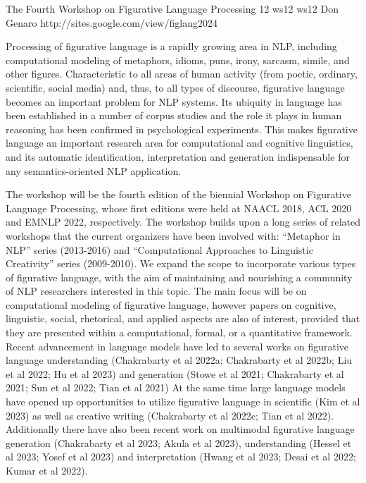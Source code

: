 \begin{wsschedulenolist}
{The Fourth Workshop on Figurative Language Processing}
{12}
{ws12}
{ws12}
{Don Genaro}
{http://sites.google.com/view/figlang2024}

Processing of figurative language is a rapidly growing area in NLP, including computational modeling of metaphors, idioms, puns, irony, sarcasm, simile, and other figures.  Characteristic to all areas of human activity (from poetic, ordinary, scientific, social media) and, thus, to all types of discourse, figurative language becomes an important problem for NLP systems. Its ubiquity in language has been established in a number of corpus studies and the role it plays in human reasoning has been confirmed in psychological experiments. This makes figurative language an important research area for computational and cognitive linguistics, and its automatic identification, interpretation and generation indispensable for any semantics-oriented NLP application.

The workshop will be the fourth edition of the biennial Workshop on Figurative Language Processing, whose first editions were held at NAACL 2018, ACL 2020 and EMNLP 2022, respectively. The workshop builds upon a long series of related workshops that the current organizers have been involved with: “Metaphor in NLP” series (2013-2016) and “Computational Approaches to Linguistic Creativity” series (2009-2010). We expand the scope to incorporate various types of figurative language, with the aim of maintaining and nourishing a community of NLP researchers interested in this topic. The main focus will be on computational modeling of figurative language, however papers on cognitive, linguistic, social, rhetorical, and applied aspects are also of interest, provided that they are presented within a computational, formal, or a quantitative framework.  Recent advancement in language models have led to several works on figurative language understanding (Chakrabarty et al 2022a; Chakrabarty et al 2022b; Liu et al 2022; Hu et al 2023) and generation (Stowe et al 2021; Chakrabarty et al 2021; Sun et al 2022; Tian et al 2021)  At the same time large language models have opened up opportunities to utilize figurative language in scientific (Kim et al 2023) as well as creative writing (Chakrabarty et al 2022c; Tian et al 2022). Additionally there have also been recent work on multimodal figurative language generation (Chakrabarty et al 2023; Akula et al 2023), understanding (Hessel et al 2023; Yosef et al 2023) and interpretation (Hwang et al 2023; Desai et al 2022; Kumar et al 2022).

\end{wsschedulenolist}
